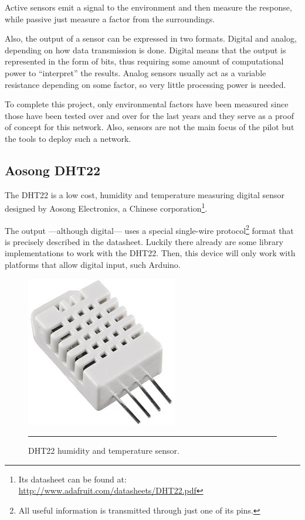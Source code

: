 Active sensors emit a signal to the environment and then measure the response, while passive just measure a factor from the surroundings.

Also, the output of a sensor can be expressed in two formats. Digital and analog, depending on how data transmission is done. Digital  means that the output is represented in the form of bits, thus requiring some amount of computational power to ``interpret'' the results. Analog sensors usually act as a variable resistance depending on some factor, so very little processing power is needed.

To complete this project, only environmental factors have been measured since those have been tested over and over for the last years and they serve as a proof of concept for this network. Also, sensors are not the main focus of the pilot but the tools to deploy such a network.

\subsection{Aosong DHT22}
\label{sub:dht}

The DHT22 is a low cost, humidity and temperature measuring digital sensor designed by Aosong Electronics, a Chinese corporation\footnote{Its datasheet can be found at: \url{http://www.adafruit.com/datasheets/DHT22.pdf}}. 

The output ---although digital--- uses a special single-wire protocol\footnote{All useful information is transmitted through just one of its pins.} format that is precisely described in the datasheet. Luckily there already are some library implementations to work with the DHT22. Then, this device will only work with platforms that allow digital input, such Arduino.

\begin{figure}[htbp]
    \centering
        \includegraphics[scale=0.8]{./Figures/dht22.jpg}
        \rule{35em}{0.5pt}
    \caption[DHT22 sensor]{DHT22 humidity and temperature sensor.}
    \label{fig:DHT22}
\end{figure}


